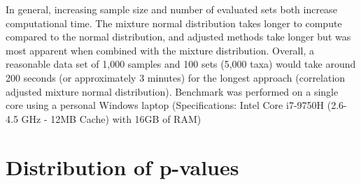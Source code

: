 \documentclass{article}
\begin{document}
In general, increasing sample size and number of evaluated sets both increase computational time. The mixture normal distribution takes longer to compute compared to the normal distribution, and adjusted methods take longer but was most apparent when combined with the mixture distribution. Overall, a reasonable data set of 1,000 samples and 100 sets (5,000 taxa) would take around 200 seconds (or approximately 3 minutes) for the longest approach (correlation adjusted mixture normal distribution). Benchmark was performed on a single core using a personal Windows laptop (Specifications: Intel Core i7-9750H (2.6-4.5 GHz - 12MB Cache) with 16GB of RAM)

\section{Distribution of p-values}



\newpage
{}

\end{document}
